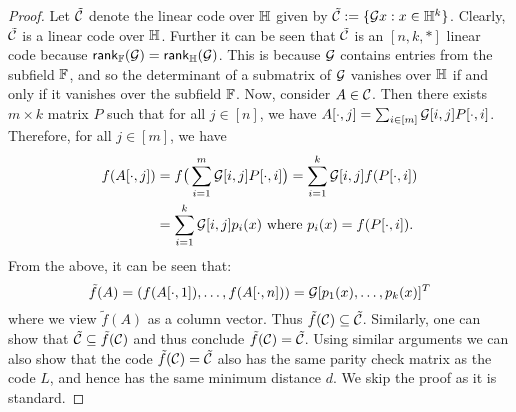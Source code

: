 \begin{proof}
Let $\tilde{\mathcal{C}}$ denote the linear code over $\mathbb{H}$ given by $\tilde{\mathcal{C}} :=
\{\mathcal{G}x: x\in \mathbb{H}^k\}$. Clearly, $\tilde{\mathcal{C}}$ is a linear code over $\mathbb{H}$.
Further it can be seen that $\tilde{\mathcal{C}}$ is an $[n,k,\ast]$ linear code because
$\mathsf{rank}_{\mathbb{F}}(\mathcal{G})=\mathsf{rank}_{\mathbb{H}}(\mathcal{G})$. This is because $\mathcal{G}$
contains entries from the subfield $\mathbb{F}$, and so the determinant of a submatrix of $\mathcal{G}$
vanishes over $\mathbb{H}$ if and only if it vanishes over the subfield $\mathbb{F}$. Now,
consider $A\in \mathcal{C}$. Then there exists $m\times k$ matrix $P$ such that for all $j\in [n]$, 
we have $A[\cdot,j]=\sum_{i\in [m]}\mathcal{G}[i,j]P[\cdot,i]$. Therefore, for all
$j\in [m]$,  we have
\begin{align*}
f(A[\cdot,j]) &= f\big(\sum_{i=1}^m \mathcal{G}[i,j]P[\cdot,i]\big) =
	 \sum_{i=1}^k \mathcal{G}[i,j]f(P[\cdot,i]) \\
	&= \sum_{i=1}^k \mathcal{G}[i,j]p_i(x) \text{ where } p_i(x)=f(P[\cdot,i]).
\end{align*}
From the above, it can be seen that:
\[ \tilde{f}(A)=(f(A[\cdot,1]),\ldots,f(A[\cdot,n]))=\mathcal{G}
[p_1(x),\ldots,p_k(x)]^T \]
 where we view $\tilde{f}(A)$ as a column vector. Thus
$\tilde{f}(\mathcal{C})\subseteq \tilde{\mathcal{C}}$. Similarly, one can show that
$\tilde{\mathcal{C}}\subseteq \tilde{f}(\mathcal{C})$ and thus conclude
$\tilde{f}(\mathcal{C})=\tilde{\mathcal{C}}$. Using similar arguments we can also show
that the code $\tilde{f}(\mathcal{C})=\tilde{\mathcal{C}}$ also has the same parity check
matrix as the code $L$, and hence has the same minimum distance $d$. We skip the
proof as it is standard. 
\end{proof}


